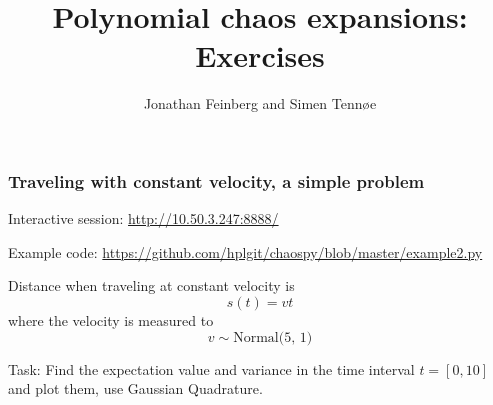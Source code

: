 \documentclass{beamer}
\title{Polynomial chaos expansions: Exercises}
\author{Jonathan Feinberg and Simen Tennøe}
\begin{document}
\begin{frame}
  \maketitle
\end{frame}


\begin{frame}
\frametitle{Traveling with constant velocity, a simple problem}
   \begin{alert}{Interactive session:}
\href{http://10.50.3.247:8888/}{http://10.50.3.247:8888/}
  \end{alert}
 
   
    \begin{alert}{Example code:}
\href{https://github.com/hplgit/chaospy/blob/master/example2.py}{https://github.com/hplgit/chaospy/blob/master/example2.py}\newline
  \end{alert}  
 
  
 Distance when traveling at constant velocity is
\[s(t) = vt\]
\pause
where the velocity is measured to
\[v \sim \text{Normal(5, 1)}\]
\pause
\begin{alert}{Task:}
 Find the expectation value and variance in the time interval $t=[0,10]$  and plot them, use Gaussian Quadrature.
\end{alert}

\end{frame}
\end{document}
